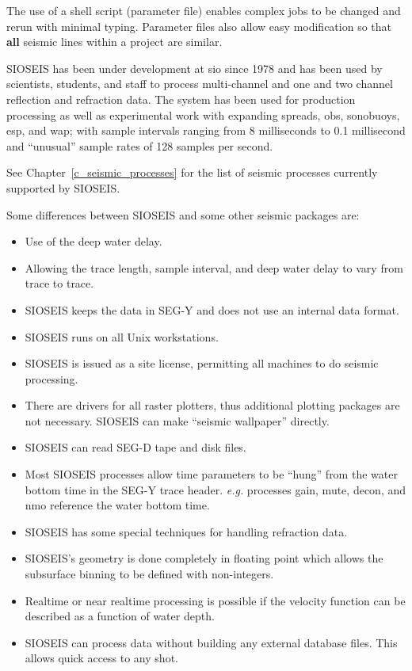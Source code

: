 The use of a shell script (parameter file) enables complex jobs to
be changed and rerun with minimal typing.  Parameter files also
allow easy modification so that \textbf{all} seismic lines within a project
are similar.

SIOSEIS has been under development at \gls{sio}
since 1978 and has been used by scientists,
students, and staff to process multi-channel and one and two
channel reflection and refraction data.  The system has been used
for production processing as well as experimental work with
expanding spreads, \gls{obs}, %
sonobuoys, \gls{esp},
and
\gls{wap}; with sample intervals ranging from 8 milliseconds to 0.1 millisecond and
``unusual'' sample rates of 128 samples per second.

See Chapter~\ref{c_seismic_processes} for the list of seismic processes currently supported by SIOSEIS.

Some differences between SIOSEIS and some other seismic packages are:
\begin{itemize}
\item Use of the deep water delay.
\item Allowing the trace length, sample interval, and deep water delay to vary from trace to trace.
\item SIOSEIS keeps the data in SEG-Y and does not use an internal data format.
\item SIOSEIS runs on all Unix workstations.
\item SIOSEIS is issued as a site license, permitting all machines to do seismic processing.
\item There are drivers for all raster plotters, thus additional plotting packages are not necessary.  SIOSEIS can make ``seismic wallpaper'' directly.
\item SIOSEIS can read SEG-D tape and disk files.
\item Most SIOSEIS processes allow time parameters to be ``hung'' from the
      water bottom time in the SEG-Y trace header. \textit{e.g.} processes gain,
      mute, decon, and nmo reference the water bottom time.
\item SIOSEIS has some special techniques for handling refraction data.
\item SIOSEIS's geometry is done completely in floating point which allows the subsurface binning to be defined with non-integers.
\item Realtime or near realtime processing is possible if the velocity function can be described as a function of water depth.
\item SIOSEIS can process data without building any external database files.  This allows quick access to any \gls{shot}.
\end{itemize}

